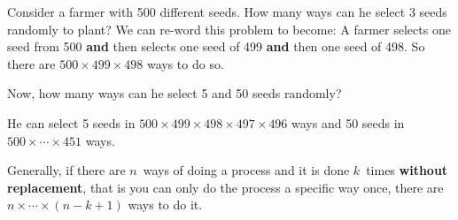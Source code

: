 \begin{example}
Consider a farmer with 500 different seeds. How many ways can he select 3 seeds randomly to plant?
\tcblower
We can re-word this problem to become: A farmer selects one seed from 500 \textbf{and} then selects one seed of 499 \textbf{and} then one seed of 498. So there are $500 \times 499 \times 498$ ways to do so.
\par\bigskip
Now, how many ways can he select 5 and 50 seeds randomly?
\par\medskip
He can select 5 seeds in $500 \times 499 \times 498 \times 497 \times 496$ ways and 50 seeds in $500 \times \cdots \times 451$ ways.
\end{example}
\begin{info}
Generally, if there are $n$~ways of doing a process and it is done $k$~times \textbf{without replacement}, that is you can only do the process a specific way once, there are $n \times \cdots \times (n-k+1)$ ways to do it.
\end{info}